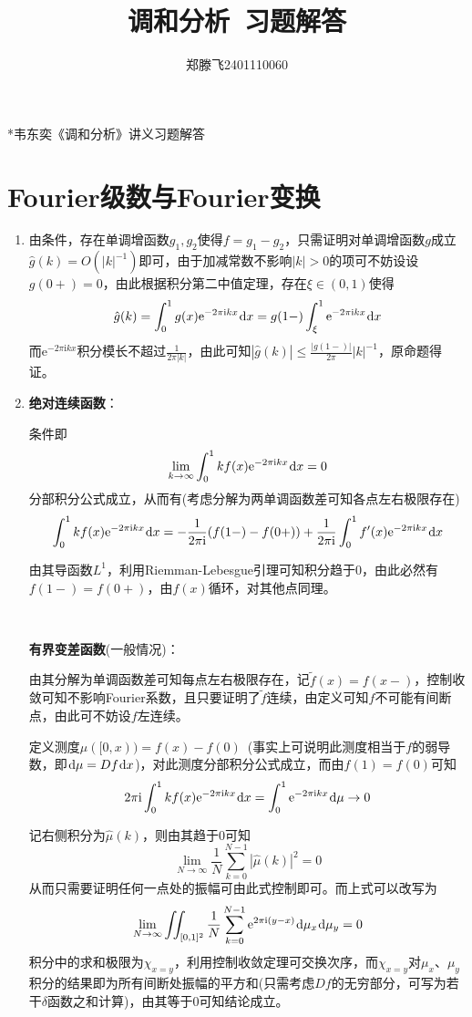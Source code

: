 \documentclass[a4paper,UTF8,fontset=windows]{ctexart}
\title{\heiti 调和分析\ 习题解答}
\author{郑滕飞2401110060}
\date{}
\newcommand*{\er}{\mathrm{e}}
\newcommand*{\ir}{\mathrm{i}}
\newcommand*{\dr}{\hspace{0.07em}\mathrm{d}}
\begin{document}
\maketitle
*韦东奕《调和分析》讲义习题解答

\tableofcontents
\newpage

\section{Fourier级数与Fourier变换}
\begin{enumerate}
    \item 由条件，存在单调增函数$g_1,g_2$使得$f=g_1-g_2$，只需证明对单调增函数$g$成立$\hat{g}(k)=O(|k|^{-1})$即可，由于加减常数不影响$|k|>0$的项可不妨设设$g(0+)=0$，由此根据积分第二中值定理，存在$\xi\in(0,1)$使得
    $$\hat{g}(k)=\int_0^1g(x)\er^{-2\pi\ir kx}\dr x=g(1-)\int_{\xi}^1\er^{-2\pi\ir kx}\dr x$$
    而$\er^{-2\pi\ir kx}$积分模长不超过$\frac{1}{2\pi|k|}$，由此可知$|\hat{g}(k)|\le\frac{|g(1-)|}{2\pi}|k|^{-1}$，原命题得证。

    \item 
    \textbf{绝对连续函数}：
    
    条件即
    $$\lim_{k\to\infty}\int_0^1kf(x)\er^{-2\pi\ir kx}\dr x=0$$
    分部积分公式成立，从而有(考虑分解为两单调函数差可知各点左右极限存在)
    $$\int_0^1kf(x)\er^{-2\pi\ir kx}\dr x=-\frac{1}{2\pi\ir}(f(1-)-f(0+))+\frac{1}{2\pi\ir}\int_0^1f'(x)\er^{-2\pi\ir kx}\dr x$$

    由其导函数$L^1$，利用Riemman-Lebesgue引理可知积分趋于0，由此必然有$f(1-)=f(0+)$，由$f(x)$循环，对其他点同理。

    \

    \textbf{有界变差函数}(一般情况)：

    由其分解为单调函数差可知每点左右极限存在，记$\tilde{f}(x)=f(x-)$，控制收敛可知不影响Fourier系数，且只要证明了$\tilde{f}$连续，由定义可知$f$不可能有间断点，由此可不妨设$f$左连续。

    定义测度$\mu([0,x))=f(x)-f(0)$\ (事实上可说明此测度相当于$f$的弱导数，即$\dr\mu=Df\dr x$)，对此测度分部积分公式成立，而由$f(1)=f(0)$可知
    $$2\pi\ir\int_0^1kf(x)\er^{-2\pi\ir kx}\dr x=\int_0^1\er^{-2\pi\ir kx}\dr\mu\to 0$$

    记右侧积分为$\hat{\mu}(k)$，则由其趋于0可知
    $$\lim_{N\to\infty}\frac{1}{N}\sum_{k=0}^{N-1}|\hat{\mu}(k)|^2=0$$
    从而只需要证明任何一点处的振幅可由此式控制即可。而上式可以改写为
    $$\lim_{N\to\infty}\iint_{[0,1]^2}\frac{1}{N}\sum_{k=0}^{N-1}\er^{2\pi\ir(y-x)}\dr\mu_x\dr\mu_y=0$$
    积分中的求和极限为$\chi_{x=y}$，利用控制收敛定理可交换次序，而$\chi_{x=y}$对$\mu_x$、$\mu_y$积分的结果即为所有间断处振幅的平方和(只需考虑$Df$的无穷部分，可写为若干$\delta$函数之和计算)，由其等于0可知结论成立。


\end{enumerate}
\end{document}

